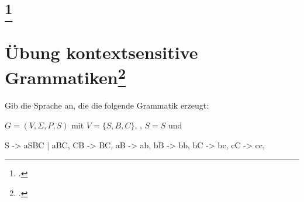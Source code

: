 \documentclass{lehramt-informatik-aufgabe}
\begin{document}
\section{
\footcite{theo:fs:3}}

\section{Übung kontextsensitive Grammatiken\footcite[Seite 8]{theo:fs:3}}

Gib die Sprache an, die die folgende Grammatik erzeugt:

$G = (V, \Sigma, P, S)$ mit
$V = \{S, B, C\}$, ,
$S=S$ und

\begin{liProduktionsRegeln}
S -> aSBC | aBC,
CB -> BC,
aB -> ab,
bB -> bb,
bC -> bc,
cC -> cc,
\end{liProduktionsRegeln}
\end{document}
